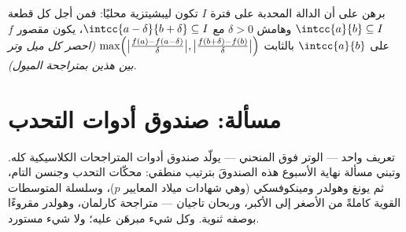 \begin{exercise}[$\star\star\star$]\label{exo:b2:realfun:12}
برهن على أن الدالة المحدبة على فترة \emph{} $I$ تكون
ليبشيتزية محليًا: فمن أجل كل قطعة $\intcc{a}{b} \subseteq I$
وهامش $\delta > 0$ مع $\intcc{a - \delta}{b + \delta}
\subseteq I$، يكون مقصور $f$ على $\intcc{a}{b}$
 بالثابت
$\max\Bigl(\bigl|\frac{f(a) - f(a - \delta)}{\delta}\bigr|,
\bigl|\frac{f(b + \delta) - f(b)}{\delta}\bigr|\Bigr)$
\emph{(احصر كل ميل وتر بين هذين بمتراجحة الميول)}.
\end{exercise}

\section{مسألة: صندوق أدوات التحدب}

تعريف واحد --- الوتر فوق المنحني --- يولّد صندوق
أدوات المتراجحات الكلاسيكية كله. وتبني مسألة نهاية الأسبوع هذه
الصندوقَ بترتيب منطقي: محكّات التحدب وجنسن التام،
ثم يونغ وهولدر ومينكوفسكي (وهي شهادات ميلاد
المعايير $p$)، وسلسلة المتوسطات القوية كاملةً من الأصغر إلى
الأكبر، وربحان تاجيان --- متراجحة كارلمان، وهولدر
مقروءًا بوصفه ثنوية. وكل شيء مبرهَن عليه؛ ولا شيء
مستورد.

